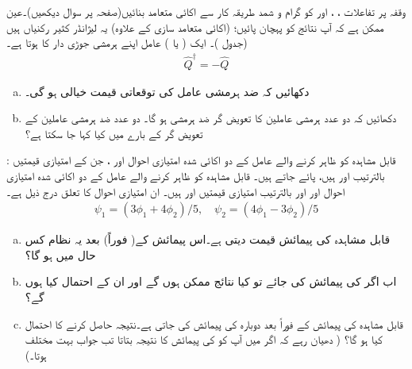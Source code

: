  وقفہ  پر تفاعلات ، ،  اور  کو گرام و شمد طریقہ کار سے اکائی متعامد بنائیں(صفحہ  پر سوال  دیکھیں)۔عین ممکن ہے کہ آپ نتائج کو پہچان پائیں؛ (اکائی متعامد سازی کے علاوہ) یہ لیژانڈر کثیر رکنیاں ہیں (جدول )۔
ایک ( یا ) عامل اپنے ہرمشی جوڑی دار کا  ہوتا ہے۔ 
 \begin{align}
 \hat{Q}^{\dagger} = -\hat{Q}
 \end{align}
\begin{enumerate}[a.]
\item
 دکھائیں کہ ضد ہرمشی عامل کی توقعاتی قیمت خیالی ہو گی۔
\item
 دکھائیں کہ دو عدد ہرمشی عاملین کا تعویض گر ضد ہرمشی ہو گا۔ دو عدد ضد ہرمشی عاملین کے تعویض گر کے بارے میں کیا کہا جا سکتا ہے؟ 
\end{enumerate}
: \quad
قابل مشاہدہ  کو ظاہر کرنے والے عامل  کے دو اکائی شدہ امتیازی احوال اور ، جن کے امتیازی قیمتیں بالترتیب اور ہیں، پائے جاتے ہیں۔ قابل مشاہدہ  کو ظاہر کرنے والے عامل  کے دو اکائی شدہ امتیازی احوال اور  اور بالترتیب امتیازی قیمتیں اور  ہیں۔ ان امتیازی احوال کا تعلق درج ذیل ہے۔ 
\begin{align*}
\psi_{1} = ( 3\phi_{1} + 4\phi_{2})/5, \quad \psi_{2} = ( 4\phi_{1} - 3\phi_{2})/5
\end{align*}
\begin{enumerate}[a.]
\item 
 قابل مشاہدہ  کی پیمائش  قیمت دیتی ہے۔اس پیمائش کے( فوراً) بعد یہ نظام کس حال میں ہو گا؟ 
\item
 اب اگر  کی پیمائش کی جائے تو کیا نتائج ممکن ہوں گے اور ان کے احتمال کیا ہوں گے؟ 
\item
 قابل مشاہدہ  کی پیمائش کے فوراً بعد دوبارہ  کی پیمائش کی جاتی ہے۔نتیجہ  حاصل کرنے کا احتمال کیا ہو گا؟ ( دھیان رہے کہ اگر میں آپ کو  کی پیمائش کا نتیجہ بتاتا تب جواب بہت مختلف ہوتا۔) 
\end{enumerate}
